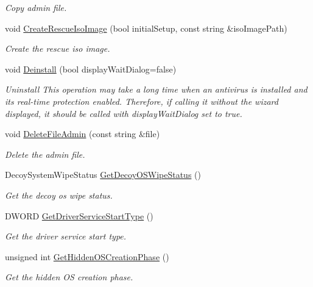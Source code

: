 \begin{DoxyCompactItemize}
\begin{DoxyCompactList}\small\item\em Copy admin file. \end{DoxyCompactList}\item 
void \hyperlink{class_gost_crypt_1_1_boot_encryption_ab59c76cffa448f8d818aa2189340045a}{Create\+Rescue\+Iso\+Image} (bool initial\+Setup, const string \&iso\+Image\+Path)
\begin{DoxyCompactList}\small\item\em Create the rescue iso image. \end{DoxyCompactList}\item 
void \hyperlink{class_gost_crypt_1_1_boot_encryption_a9ac6f366c5a3c03ac5891ba22afe769d}{Deinstall} (bool display\+Wait\+Dialog=false)
\begin{DoxyCompactList}\small\item\em Uninstall This operation may take a long time when an antivirus is installed and its real-\/time protection enabled. Therefore, if calling it without the wizard displayed, it should be called with display\+Wait\+Dialog set to true. \end{DoxyCompactList}\item 
void \hyperlink{class_gost_crypt_1_1_boot_encryption_a879bd63fb7a3dd4e66c12787b5808c40}{Delete\+File\+Admin} (const string \&file)
\begin{DoxyCompactList}\small\item\em Delete the admin file. \end{DoxyCompactList}\item 
Decoy\+System\+Wipe\+Status \hyperlink{class_gost_crypt_1_1_boot_encryption_a32a8979f6ea15a11e10bc26d19df9cc5}{Get\+Decoy\+O\+S\+Wipe\+Status} ()
\begin{DoxyCompactList}\small\item\em Get the decoy os wipe status. \end{DoxyCompactList}\item 
D\+W\+O\+RD \hyperlink{class_gost_crypt_1_1_boot_encryption_ae710a86e41ba731cf231fad660dc16a9}{Get\+Driver\+Service\+Start\+Type} ()
\begin{DoxyCompactList}\small\item\em Get the driver service start type. \end{DoxyCompactList}\item 
unsigned int \hyperlink{class_gost_crypt_1_1_boot_encryption_aa66b29a9ad9bd1aa8b7aece9d9eaca2c}{Get\+Hidden\+O\+S\+Creation\+Phase} ()
\begin{DoxyCompactList}\small\item\em Get the hidden OS creation phase. \end{DoxyCompactList}\item 

\end{DoxyCompactItemize}

